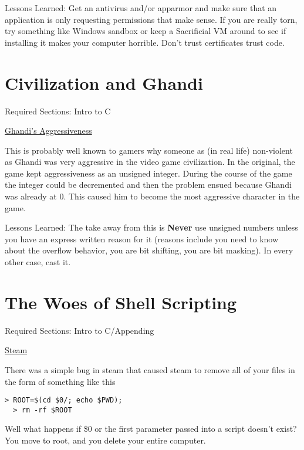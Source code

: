Lessons Learned: Get an antivirus and/or apparmor and make sure that an application is only requesting permissions that make sense. If you are really torn, try something like Windows sandbox or keep a Sacrificial VM around to see if installing it makes your computer horrible. Don't trust certificates trust code.

\section{Civilization and Ghandi}

Required Sections: Intro to C

\href{https://www.geek.com/games/why-gandhi-is-always-a-warmongering-jerk-in-civilization-1608515/}{Ghandi's Aggressiveness}

This is probably well known to gamers why someone as (in real life) non-violent as Ghandi was very aggressive in the video game civilization. In the original, the game kept aggressiveness as an unsigned integer. During the course of the game the integer could be decremented and then the problem ensued because Ghandi was already at 0. This caused him to become the most aggressive character in the game.

Lessons Learned: The take away from this is \textbf{Never} use unsigned numbers unless you have an express written reason for it (reasons include you need to know about the overflow behavior, you are bit shifting, you are bit masking). In every other case, cast it.


\section{The Woes of Shell Scripting}

Required Sections: Intro to C/Appending

\href{https://www.pcworld.com/article/2871653/scary-steam-for-linux-bug-erases-all-the-personal-files-on-your-pc.html}{Steam}

There was a simple bug in steam that caused steam to remove all of your files in the form of something like this

\begin{lstlisting}[language=console]
  > ROOT=$(cd $0/; echo $PWD);
  > rm -rf $ROOT
\end{lstlisting}

Well what happens if \$0 or the first parameter passed into a script doesn't exist? You move to root, and you delete your entire computer.

